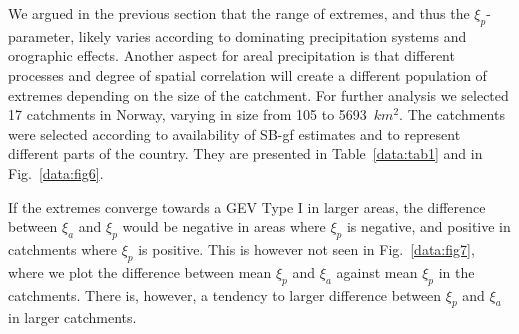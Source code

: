 \documentclass[12pt,a4paper,english]{article}
\begin{document}
    

We argued in the previous section that the range of extremes, and thus the $\xi_{p}$-parameter, likely varies according to dominating precipitation systems and orographic effects. Another aspect for areal precipitation is that different processes and degree of spatial correlation will create a different population of extremes depending on the size of the catchment.
For further analysis we selected 17 catchments in Norway, varying in size from 105 to 5693~$km^2$. The catchments were selected according to availability of SB-gf estimates and to represent different parts of the country. They are presented in Table~\ref{data:tab1} and in Fig.~\ref{data:fig6}.   

If the extremes converge towards a GEV Type I in larger areas, the difference between $\xi_{a}$ and $\xi_{p}$ would be negative in areas where $\xi_{p}$ is negative, and positive in catchments where $\xi_{p}$ is positive. This is however not seen in Fig.~\ref{data:fig7}, where we plot the difference between mean $\xi_{p}$ and $\xi_{a}$ against mean $\xi_{p}$ in the catchments. There is, however, a tendency to larger difference between $\xi_{p}$ and $\xi_{a}$ in larger catchments. 
\end{document}
